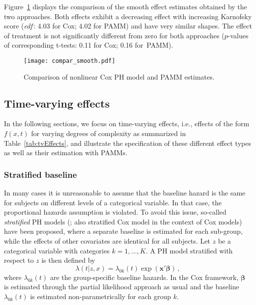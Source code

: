 \documentclass[submit]{smj}
\newcommand{\bfx}{\mathbf{x}}
\newcommand{\bsbeta}{\boldsymbol{\beta}}
\begin{document}
Figure~\ref{fig:comp:smo} displays the comparison of the smooth effect
estimates obtained by the two approaches. Both effects exhibit a decreasing
effect with increasing Karnofsky score ({\it edf}\,: 4.03 for Cox; 4.02 for PAMM)
and have very similar shapes. The effect of treatment  is not significantly different from zero for
both approaches ($p$-values of corresponding t-tests: 0.11 for Cox; 0.16 for~PAMM).
\begin{figure}[!ht]
\begin{center}
\texttt{[image: compar\_smooth.pdf]}
\vspace{-20pt}
\caption{Comparison of nonlinear Cox PH model and PAMM estimates.}
\label{fig:comp:smo}
\end{center}
\end{figure}

\subsection{Time-varying effects}\label{ssec:timevary}
In the following sections, we focus on time-varying effects, i.e., effects of the
form $f(x, t)$ for varying degrees of complexity as summarized in Table~\ref{tab:tvEffects},
and illustrate the specification of these different effect types as well
as their estimation with PAMMs.

\subsubsection{Stratified baseline}\label{sssec:stratifiedPH}
In many cases it is unreasonable to assume that the baseline hazard is the
same for subjects on different levels of a categorical variable.
In that case, the proportional hazards assumption is violated.
To avoid this issue, so-called \emph{stratified} PH models
(\citealp[Ch.\ 9.3]{klein1997}; also stratified Cox model in the context of Cox models)
have been proposed,
where a separate baseline is estimated for each sub-group,
while the effects of other covariates are identical for all subjects.
Let $z$ be a categorical variable with categories $k=1,\ldots, K$. A
PH model stratified with respect to $z$ is then defined by
\begin{equation}\label{eq:stratifiedPH}
\lambda(t|z, x) = \lambda_{0k}(t)\exp(\bfx'\bsbeta)\,,
\end{equation}
where $\lambda_{0k}(t)$ are the group-specific baseline hazards. In the Cox
framework, $\bsbeta$ is estimated through the partial likelihood approach as
usual and the baseline $\lambda_{0k}(t)$ is estimated non-parametrically for
each group $k$.
\end{document}
